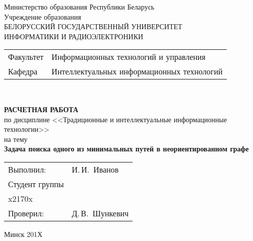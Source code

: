 \begin{titlepage}
  \begin{center}
    Министерство образования Республики Беларусь\\[1em]
    Учреждение образования\\
    БЕЛОРУССКИЙ ГОСУДАРСТВЕННЫЙ УНИВЕРСИТЕТ \\
    ИНФОРМАТИКИ И РАДИОЭЛЕКТРОНИКИ\\[1em]

    \begin{minipage}{\textwidth}
      \begin{flushleft}
        \begin{tabular}{ l l }
          Факультет & Информационных технологий и управления\\
          Кафедра   & Интеллектуальных информационных технологий
        \end{tabular}
      \end{flushleft}
    \end{minipage}\\[1em]

    \vspace{5em}


    \textbf{РАСЧЕТНАЯ РАБОТА}\\
    {по дисциплине <<Традиционные и интеллектуальные информационные технологии>>}\\
    на тему\\
    \textbf{\large Задача поиска одного из минимальных путей в неориентированном графе}\\[1em]

    \vspace{10em}
    
    \begin{tabular}{ p{}p{} }
      Выполнил:& И.\,И.~Иванов \\[1em]
      Студент группы& \\
      x2170x & \\
      Проверил: & Д.\,В.~Шункевич \\
     
    \end{tabular}
    
    \vfill
    {\normalsize Минск 201Х}
  \end{center}
\end{titlepage}
